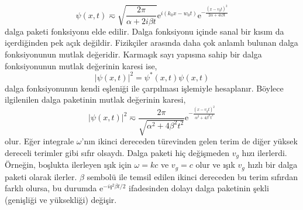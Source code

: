 \documentclass[a4paper,12pt, twoside]{article}
\begin{document}
\begin{equation}
\psi(x,t) \eqsim \sqrt{\frac{2\pi}{\alpha + 2 i \beta t }}\text{e}^{i(k_0x-w_0t)} \text{e}^{-\frac{(x-v_g t)^2}{2\alpha + 4i\beta t}}
\label{eq:wave_packet_t_approx}
\end{equation}
dalga paketi fonksiyonu elde edilir. Dalga fonksiyonu içinde sanal bir kısım da içerdiğinden pek açık değildir. Fizikçiler arasında daha çok anlamlı bulunan dalga fonksiyonunun mutlak değeridir. Karmaşık sayı yapısına sahip bir dalga fonksiyonunun mutlak değerinin karesi ise,
\begin{equation}
|\psi(x,t)|^2 = \psi^*(x,t)  \psi(x,t) 
\end{equation}
dalga fonksiyonunun kendi eşleniği ile çarpılması işlemiyle hesaplanır. Böylece ilgilenilen dalga paketinin mutlak değerinin karesi,
\begin{equation}
|\psi(x,t)|^2 \eqsim \frac{2\pi}{\sqrt{\alpha^2 + 4 \beta^2 t^2 }} \text{e}^{-\frac{(x-v_g t)^2}{\alpha^2 + 4\beta^2 t^2}}
\label{eq:wave_packet_t_approx}
\end{equation}
olur. Eğer integrale $\omega$'nın ikinci dereceden türevinden gelen terim de diğer yüksek dereceli terimler gibi sıfır olsaydı. Dalga paketi hiç değişmeden $v_g$ hızı ilerlerdi. Örneğin, boşlukta ilerleyen ışık için $\omega=kc$ ve $v_g=c$ olur ve ışık $v_g$ hızlı bir dalga paketi olarak ilerler. $\beta$ sembolü ile temsil edilen ikinci dereceden bu terim sıfırdan farklı olursa, bu durumda $\text{e}^{-iq^2\beta t/2}$ ifadesinden dolayı dalga paketinin şekli (genişliği ve yüksekliği) değişir. 
\end{document}
